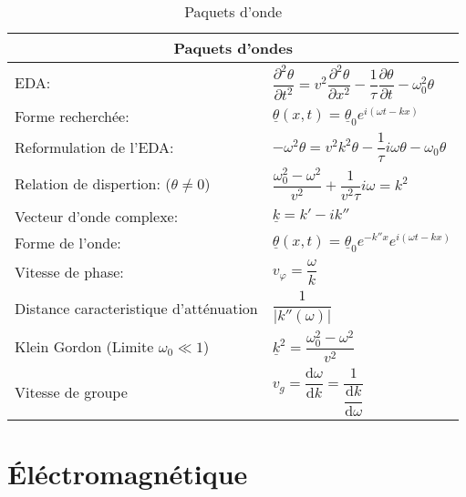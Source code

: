 \documentclass[10pt,a4paper,titlepage,landscape]{article}
\renewcommand{\d}
{
    \mathrm{d}
}
\newcommand*{\dv}[2]
{
    \dfrac{\d#1}{\d#2}
}
\newcommand*{\dpv}[2]
{
    \dfrac{\partial#1}{\partial#2}
}
\newcommand*{\ddpv}[2]
{
    \dfrac{\partial^2#1}{\partial{#2}^2}
}
\renewcommand{\arraystretch}{2}
\begin{document}
\begin{table}[H]
    \centering
    \renewcommand{\arraystretch}{1.5} %
    \setlength{\tabcolsep}{8pt} %
    \begin{tabular}{@{}|p{9cm}|p{10cm}@{}|}

        \multicolumn{2}{c}{\textbf{Paquets d'ondes}} \\ \hline

        EDA: & $\ddpv{\theta}{t}=v^2\ddpv{\theta}{x}-\dfrac{1}{\tau}\dpv{\theta}{t}-\omega_0^2\theta$ \\ \hline
        Forme recherchée: & $\underline{\theta}(x,t)=\underline{\theta}_0e^{i(\omega t-kx)}$\\ \hline
        Reformulation de l'EDA: & $-\omega^2\theta=v^2k^2\theta-\dfrac{1}{\tau}i\omega\theta-\omega_0\theta$\\ \hline
        Relation de dispertion: ($\theta\neq0$) & $\dfrac{\omega_0^2-\omega^2}{v^2}+\dfrac{1}{v^2\tau}i\omega=k^2$\\ \hline
        Vecteur d'onde complexe: & $\underline{k}=k'-ik ''$\\ \hline
        Forme de l'onde: & $\underline{\theta}(x,t)=\underline{\theta}_0e^{-k''x}e^{i(\omega t-kx)}$\\ \hline
        Vitesse de phase: & $v_{\varphi}=\dfrac{\omega}{k}$ \\ \hline
        Distance caracteristique d'atténuation & $\dfrac{1}{|k''(\omega)|}$ \\ \hline
        Klein Gordon (Limite $\omega_0 \ll 1$) & $\underline{k}^2=\dfrac{\omega_0^2-\omega^2}{v^2}$ \\ \hline
        Vitesse de groupe & $v_g=\dv{\omega}{k}=\dfrac{1}{\dv{k}{\omega}}$ \\ \hline
    \end{tabular}
\caption{Paquets d'onde}
\label{tab:packonde}
\end{table}

\section{Éléctromagnétique}
\end{document}
